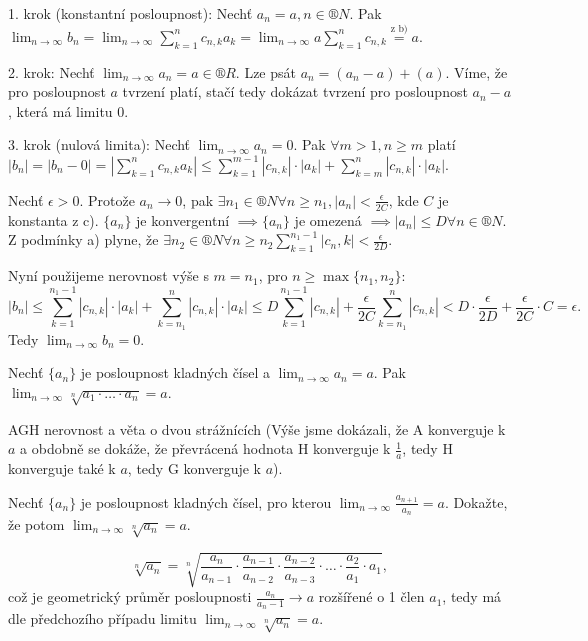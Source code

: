 \documentclass[12pt]{article}					%
\begin{document}
    \begin{dukaz}
        1. krok (konstantní posloupnost): Nechť $a_n = a, n \in ®N$. Pak $\lim_{n \rightarrow ∞} b_n = \lim_{n \rightarrow ∞} \sum_{k=1}^n c_{n, k} a_k = \lim_{n \rightarrow ∞} a\sum_{k=1}^n c_{n, k} \overset{\text{z b)}}{=} a$.

        2. krok: Nechť $\lim_{n \rightarrow ∞} a_n = a \in ®R$. Lze psát $a_n = (a_n - a) + (a)$. Víme, že pro posloupnost $a$ tvrzení platí, stačí tedy dokázat tvrzení pro posloupnost $a_n - a$, která má limitu 0.

        3. krok (nulová limita): Nechť $\lim_{n \rightarrow ∞} a_n = 0$. Pak $\forall m > 1, n≥m$ platí $|b_n| = |b_n - 0| = |\sum_{k=1}^n c_{n, k} a_k| ≤ \sum_{k=1}^{m-1} |c_{n, k}|·|a_k| + \sum_{k=m}^n |c_{n, k}|·|a_k|$.

        Nechť $\epsilon > 0$. Protože $a_n \rightarrow 0$, pak $\exists n_1 \in ®N \forall n ≥ n_1, |a_n| < \frac{\epsilon}{2C}$, kde $C$ je konstanta z c). $\{a_n\}$ je konvergentní $\implies \{a_n\}$ je omezená $\implies |a_n| ≤ D \forall n \in ®N$. Z podmínky a) plyne, že $\exists n_2 \in ®N \forall n ≥ n_2 \sum_{k=1}^{n_1-1}|c_n, k| < \frac{\epsilon}{2D}$.

        Nyní použijeme nerovnost výše s $m = n_1$, pro $n ≥ \max\{n_1, n_2\}$:
        $$ |b_n| ≤ \sum_{k=1}^{n_1-1} |c_{n, k}|·|a_k| + \sum_{k=n_1}^n |c_{n, k}|·|a_k| ≤ D\sum_{k=1}^{n_1-1} |c_{n, k}| + \frac{\epsilon}{2C}\sum_{k=n_1}^n |c_{n, k}| < D·\frac{\epsilon}{2D} + \frac{\epsilon}{2C}·C = \epsilon. $$
        Tedy $\lim_{n \rightarrow ∞} b_n = 0$.
    \end{dukaz}

    \begin{priklad}
        Nechť $\{a_n\}$ je posloupnost kladných čísel a $\lim_{n \rightarrow ∞} a_n = a$. Pak $\lim_{n \rightarrow ∞} \sqrt[n]{a_1·…·a_n} = a$.
        \begin{reseni}
            AGH nerovnost a věta o dvou strážnících (Výše jsme dokázali, že A konverguje k $a$ a obdobně se dokáže, že převrácená hodnota H konverguje k $\frac{1}{a}$, tedy H konverguje také k $a$, tedy G konverguje k $a$).
        \end{reseni}
    \end{priklad}

    \begin{dusledek}
        Nechť $\{a_n\}$ je posloupnost kladných čísel, pro kterou $\lim_{n \rightarrow ∞} \frac{a_{n+1}}{a_n} = a$. Dokažte, že potom $\lim_{n \rightarrow ∞} \sqrt[n]{a_n} = a$.
        \begin{reseni}
            $$ \sqrt[n]{a_n} = \sqrt[n]{\frac{a_n}{a_{n-1}} · \frac{a_{n-1}}{a_{n-2}} · \frac{a_{n-2}}{a_{n-3}} · … · \frac{a_2}{a_1} · a_1}, $$
            což je geometrický průměr posloupnosti $\frac{a_n}{a_n-1} \rightarrow a$ rozšířené o 1 člen $a_1$, tedy má dle předchozího případu limitu $\lim_{n \rightarrow ∞} \sqrt[n]{a_n} = a$.
        \end{reseni}
    \end{dusledek}
\end{document}
